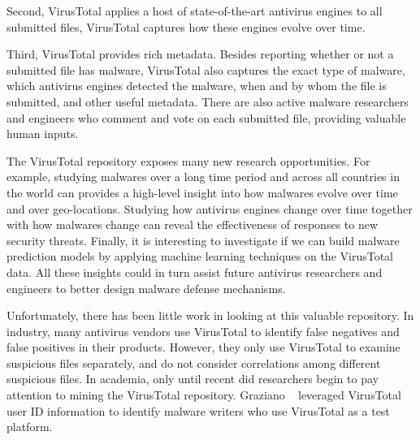 Second, VirusTotal applies a host of state-of-the-art antivirus engines to all submitted files,
VirusTotal captures how these engines evolve over time.

Third, VirusTotal provides rich metadata. 
Besides reporting whether or not a submitted file has malware, 
VirusTotal also captures the exact type of malware, 
which antivirus engines detected the malware,
when and by whom the file is submitted,
and other useful metadata.
There are also active malware researchers and engineers
who comment and vote on each submitted file, 
providing valuable human inputs. 

The VirusTotal repository exposes many new research opportunities.
For example, studying malwares over a long time period and across all countries in the world 
can provides a high-level insight into how malwares evolve over time and over geo-locations.
Studying how antivirus engines change over time together with how malwares change can 
reveal the effectiveness of responses to new security threats.
Finally, it is interesting to investigate if we can build malware prediction models 
by applying machine learning techniques on the VirusTotal data.
All these insights could in turn assist future antivirus researchers and engineers
to better design malware defense mechanisms.

Unfortunately, there has been little work in looking at this valuable repository.
In industry, many antivirus vendors use VirusTotal to identify false negatives 
and false positives in their products. 
However, they only use VirusTotal to examine suspicious files separately, 
and do not consider correlations among different suspicious files. 
In academia, only until recent did researchers begin to pay attention to mining the VirusTotal repository. 
Graziano \etal~\cite{neeles} leveraged VirusTotal user ID information to identify malware writers 
who use VirusTotal as a test platform. 

